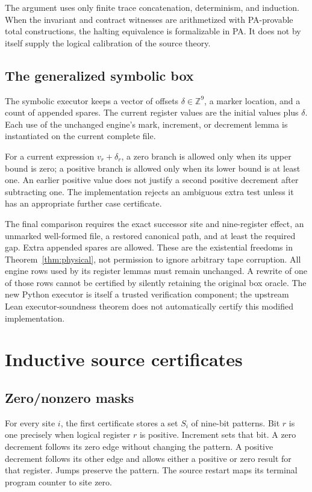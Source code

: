 \documentclass[11pt,letterpaper]{article}
\begin{document}
The argument uses only finite trace concatenation, determinism, and
induction. When the invariant and contract witnesses are arithmetized
with PA-provable total constructions, the halting equivalence is
formalizable in PA. It does not by itself supply the logical calibration
of the source theory.

\subsection{The generalized symbolic box}

The symbolic executor keeps a vector of offsets
$\delta\in\mathbb Z^9$, a marker location, and a count of appended
spares. The current register values are the initial values plus
$\delta$. Each use of the unchanged engine's mark, increment, or
decrement lemma is instantiated on the current complete file.

For a current expression $v_r+\delta_r$, a zero branch is allowed only
when its upper bound is zero; a positive branch is allowed only when
its lower bound is at least one. An earlier positive value does not
justify a second positive decrement after subtracting one. The
implementation rejects an ambiguous extra test unless it has an
appropriate further case certificate.

The final comparison requires the exact successor site and nine-register
effect, an unmarked well-formed file, a restored canonical path, and
at least the required gap. Extra appended spares are allowed. These are
the existential freedoms in Theorem~\ref{thm:physical}, not permission
to ignore arbitrary tape corruption. All engine rows used by its
register lemmas must remain unchanged. A rewrite of one of those rows
cannot be certified by silently retaining the original box oracle.
The new Python executor is itself a trusted verification component;
the upstream Lean executor-soundness theorem does not automatically
certify this modified implementation.

\section{Inductive source certificates}
\label{sec:invariants}

\subsection{Zero/nonzero masks}

For every site $i$, the first certificate stores a set $S_i$ of nine-bit
patterns. Bit $r$ is one precisely when logical register $r$ is positive.
Increment sets that bit. A zero decrement follows its zero edge without
changing the pattern. A positive decrement follows its other edge and
allows either a positive or zero result for that register. Jumps preserve
the pattern. The source restart maps its terminal program counter to
site zero.
\end{document}
